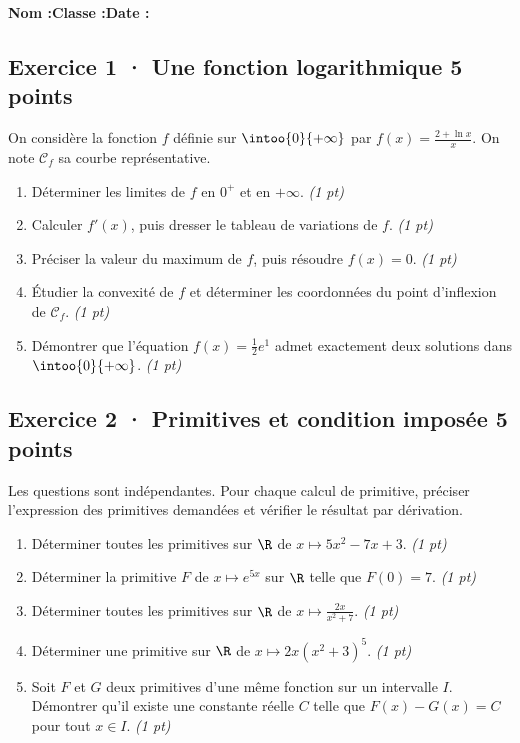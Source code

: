 \smallskip\textbf{Nom :}\enspace\dotfill\quad\textbf{Classe :}\enspace\dotfill\quad\textbf{Date :}\enspace\dotfill

\subsection*{Exercice 1 · Une fonction logarithmique \hfill 5 points}On considère la fonction $f$ définie sur $\intoo{0}{+\infty}$ par $f(x)=\frac{2+\ln x}x$. On note $\mathcal C_f$ sa courbe représentative.

\begin{enumerate}

\item Déterminer les limites de $f$ en $0^+$ et en $+\infty$. \hfill\textit{(1 pt)}

\item Calculer $f' (x)$, puis dresser le tableau de variations de $f$. \hfill\textit{(1 pt)}

\item Préciser la valeur du maximum de $f$, puis résoudre $f(x)=0$. \hfill\textit{(1 pt)}

\item Étudier la convexité de $f$ et déterminer les coordonnées du point d'inflexion de $\mathcal C_f$. \hfill\textit{(1 pt)}

\item Démontrer que l'équation $f(x)=\frac12 e^{1}$ admet exactement deux solutions dans $\intoo{0}{+\infty}$. \hfill\textit{(1 pt)}

\end{enumerate}

\subsection*{Exercice 2 · Primitives et condition imposée \hfill 5 points}Les  questions sont indépendantes. Pour chaque calcul de primitive, préciser l'expression des primitives demandées et vérifier le résultat par dérivation.

\begin{enumerate}

\item Déterminer toutes les primitives sur $\R$ de $x\mapsto 5x^2-7x+3$. \hfill\textit{(1 pt)}

\item Déterminer la primitive $F$ de $x\mapsto e^{5x}$ sur $\R$ telle que $F(0)=7$. \hfill\textit{(1 pt)}

\item Déterminer toutes les primitives sur $\R$ de $x\mapsto\frac{2x}{x^2+7}$. \hfill\textit{(1 pt)}

\item Déterminer une primitive sur $\R$ de $x\mapsto2x(x^2+3)^{5}$. \hfill\textit{(1 pt)}

\item Soit $F$ et $G$ deux primitives d'une même fonction sur un intervalle $I$. Démontrer qu'il existe une constante réelle $C$ telle que $F(x)-G(x)=C$ pour tout $x\in I$. \hfill\textit{(1 pt)}

\end{enumerate}

